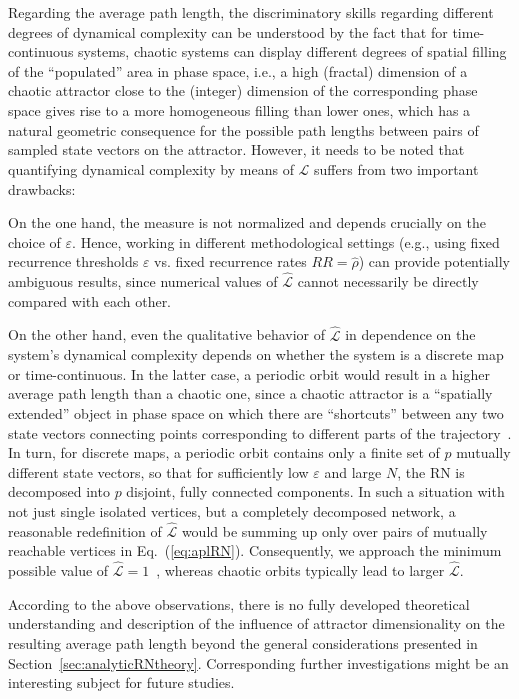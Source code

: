 		Regarding the average path length, the discriminatory skills regarding different degrees of dynamical complexity can be understood by the fact that for time-continuous systems, chaotic systems can display different degrees of spatial filling of the ``populated'' area in phase space, i.e., a high (fractal) dimension of a chaotic attractor close to the (integer) dimension of the corresponding phase space gives rise to a more homogeneous filling than lower ones, which has a natural geometric consequence for the possible path lengths between pairs of sampled state vectors on the attractor. However, it needs to be noted that quantifying dynamical complexity by means of $\hat{\mathcal{L}}$ suffers from two important drawbacks: 

		On the one hand, the measure is not normalized and depends crucially on the choice of $\varepsilon$. Hence, working in different methodological settings (e.g., using fixed recurrence thresholds $\varepsilon$ vs. fixed recurrence rates $RR=\hat{\rho}$) can provide potentially ambiguous results, since numerical values of $\hat{\mathcal{L}}$ cannot necessarily be directly compared with each other. 

		On the other hand, even the qualitative behavior of $\hat{\mathcal{L}}$ in dependence on the system's dynamical complexity depends on whether the system is a discrete map or time-continuous. In the latter case, a periodic orbit would result in a higher average path length than a chaotic one, since a chaotic attractor is a ``spatially extended'' object in phase space on which there are ``shortcuts'' between any two state vectors connecting points corresponding to different parts of the trajectory~\cite{Donner2010a}. In turn, for discrete maps, a periodic orbit contains only a finite set of $p$ mutually different state vectors, so that for sufficiently low $\varepsilon$ and large $N$, the RN is decomposed into $p$ disjoint, fully connected components. In such a situation with not just single isolated vertices, but a completely decomposed network, a reasonable redefinition of $\hat{\mathcal{L}}$ would be summing up only over pairs of mutually reachable vertices in Eq.~(\ref{eq:aplRN}). Consequently, we approach the minimum possible value of $\hat{\mathcal{L}}=1$~\cite{Marwan2009}, whereas chaotic orbits typically lead to larger $\hat{\mathcal{L}}$.

		According to the above observations, there is no fully developed theoretical understanding and description of the influence of attractor dimensionality on the resulting average path length beyond the general considerations presented in Section~\ref{sec:analyticRNtheory}. Corresponding further investigations might be an interesting subject for future studies.

